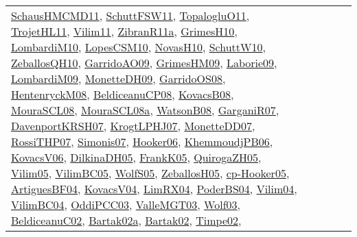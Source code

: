 {\begin{longtable}{lp{3cm}>{\raggedright}p{6cm}>{\raggedright}p{6cm}p{8cm}}
\href{articles/SchausHMCMD11.pdf}{SchausHMCMD11}\cite{SchausHMCMD11}, \href{articles/SchuttFSW11.pdf}{SchuttFSW11}\cite{SchuttFSW11}, \href{articles/TopalogluO11.pdf}{TopalogluO11}\cite{TopalogluO11}, \href{articles/TrojetHL11.pdf}{TrojetHL11}\cite{TrojetHL11}, \href{papers/Vilim11.pdf}{Vilim11}\cite{Vilim11}, \href{papers/ZibranR11a.pdf}{ZibranR11a}\cite{ZibranR11a}, \href{papers/GrimesH10.pdf}{GrimesH10}\cite{GrimesH10}, \href{papers/LombardiM10.pdf}{LombardiM10}\cite{LombardiM10}, \href{articles/LopesCSM10.pdf}{LopesCSM10}\cite{LopesCSM10}, \href{articles/NovasH10.pdf}{NovasH10}\cite{NovasH10}, \href{papers/SchuttW10.pdf}{SchuttW10}\cite{SchuttW10}, \href{articles/ZeballosQH10.pdf}{ZeballosQH10}\cite{ZeballosQH10}, \href{articles/GarridoAO09.pdf}{GarridoAO09}\cite{GarridoAO09}, \href{papers/GrimesHM09.pdf}{GrimesHM09}\cite{GrimesHM09}, \href{papers/Laborie09.pdf}{Laborie09}\cite{Laborie09}, \href{papers/LombardiM09.pdf}{LombardiM09}\cite{LombardiM09}, \href{papers/MonetteDH09.pdf}{MonetteDH09}\cite{MonetteDH09}, \href{articles/GarridoOS08.pdf}{GarridoOS08}\cite{GarridoOS08}, \href{papers/HentenryckM08.pdf}{HentenryckM08}\cite{HentenryckM08}, \href{papers/BeldiceanuCP08.pdf}{BeldiceanuCP08}\cite{BeldiceanuCP08}, \href{articles/KovacsB08.pdf}{KovacsB08}\cite{KovacsB08}, \href{papers/MouraSCL08.pdf}{MouraSCL08}\cite{MouraSCL08}, \href{papers/MouraSCL08a.pdf}{MouraSCL08a}\cite{MouraSCL08a}, \href{papers/WatsonB08.pdf}{WatsonB08}\cite{WatsonB08}, \href{papers/GarganiR07.pdf}{GarganiR07}\cite{GarganiR07}, \href{papers/DavenportKRSH07.pdf}{DavenportKRSH07}\cite{DavenportKRSH07}, \href{papers/KrogtLPHJ07.pdf}{KrogtLPHJ07}\cite{KrogtLPHJ07}, \href{papers/MonetteDD07.pdf}{MonetteDD07}\cite{MonetteDD07}, \href{papers/RossiTHP07.pdf}{RossiTHP07}\cite{RossiTHP07}, \href{articles/Simonis07.pdf}{Simonis07}\cite{Simonis07}, \href{articles/Hooker06.pdf}{Hooker06}\cite{Hooker06}, \href{papers/KhemmoudjPB06.pdf}{KhemmoudjPB06}\cite{KhemmoudjPB06}, \href{papers/KovacsV06.pdf}{KovacsV06}\cite{KovacsV06}, \href{papers/DilkinaDH05.pdf}{DilkinaDH05}\cite{DilkinaDH05}, \href{papers/FrankK05.pdf}{FrankK05}\cite{FrankK05}, \href{papers/QuirogaZH05.pdf}{QuirogaZH05}\cite{QuirogaZH05}, \href{papers/Vilim05.pdf}{Vilim05}\cite{Vilim05}, \href{articles/VilimBC05.pdf}{VilimBC05}\cite{VilimBC05}, \href{papers/WolfS05.pdf}{WolfS05}\cite{WolfS05}, \href{articles/ZeballosH05.pdf}{ZeballosH05}\cite{ZeballosH05}, \href{papers/cp-Hooker05.pdf}{cp-Hooker05}\cite{cp-Hooker05}, \href{papers/ArtiguesBF04.pdf}{ArtiguesBF04}\cite{ArtiguesBF04}, \href{papers/KovacsV04.pdf}{KovacsV04}\cite{KovacsV04}, \href{papers/LimRX04.pdf}{LimRX04}\cite{LimRX04}, \href{articles/PoderBS04.pdf}{PoderBS04}\cite{PoderBS04}, \href{papers/Vilim04.pdf}{Vilim04}\cite{Vilim04}, \href{papers/VilimBC04.pdf}{VilimBC04}\cite{VilimBC04}, \href{papers/OddiPCC03.pdf}{OddiPCC03}\cite{OddiPCC03}, \href{papers/ValleMGT03.pdf}{ValleMGT03}\cite{ValleMGT03}, \href{papers/Wolf03.pdf}{Wolf03}\cite{Wolf03}, \href{papers/BeldiceanuC02.pdf}{BeldiceanuC02}\cite{BeldiceanuC02}, \href{papers/Bartak02a.pdf}{Bartak02a}\cite{Bartak02a}, \href{papers/Bartak02.pdf}{Bartak02}\cite{Bartak02}, \href{articles/Timpe02.pdf}{Timpe02}\cite{Timpe02}, 
\end{longtable}}
